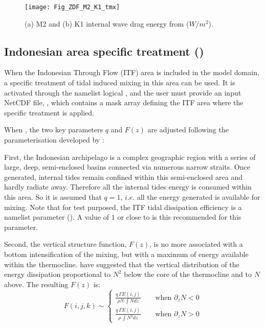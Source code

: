 \documentclass[../tex_main/NEMO_manual]{subfiles}
\begin{document}
\begin{figure}[!t] 	\begin{center}
\texttt{[image: Fig\_ZDF\_M2\_K1\_tmx]}
\caption{  \protect\label{fig:ZDF_M2_K1_tmx} 
(a) M2 and (b) K1 internal wave drag energy from \citet{Carrere_Lyard_GRL03} ($W/m^2$). }
\end{center}  	\end{figure}
 
\subsection{Indonesian area specific treatment (\protect{})}
\label{subsec:ZDF_tmx_itf}

When the Indonesian Through Flow (ITF) area is included in the model domain,
a specific treatment of tidal induced mixing in this area can be used. 
It is activated through the namelist logical , and the user must provide
an input NetCDF file, , which contains a mask array defining the ITF area
where the specific treatment is applied.

When , the two key parameters $q$ and $F(z)$ are adjusted following 
the parameterisation developed by \citet{Koch-Larrouy_al_GRL07}:

First, the Indonesian archipelago is a complex geographic region 
with a series of large, deep, semi-enclosed basins connected via 
numerous narrow straits. Once generated, internal tides remain 
confined within this semi-enclosed area and hardly radiate away. 
Therefore all the internal tides energy is consumed within this area. 
So it is assumed that $q = 1$, $i.e.$ all the energy generated is available for mixing.
Note that for test purposed, the ITF tidal dissipation efficiency is a 
namelist parameter (). A value of $1$ or close to is
this recommended for this parameter.

Second, the vertical structure function, $F(z)$, is no more associated
with a bottom intensification of the mixing, but with a maximum of 
energy available within the thermocline. \citet{Koch-Larrouy_al_GRL07} 
have suggested that the vertical distribution of the energy dissipation 
proportional to $N^2$ below the core of the thermocline and to $N$ above. 
The resulting $F(z)$ is:
\begin{equation} \label{eq:Fz_itf}
F(i,j,k) \sim     \left\{ \begin{aligned}
\frac{q\,\Gamma E(i,j) } {\rho N \, \int N     dz}    \qquad \text{when $\partial_z N < 0$} \\
\frac{q\,\Gamma E(i,j) } {\rho     \, \int N^2 dz}    \qquad \text{when $\partial_z N > 0$}
                      \end{aligned} \right.
\end{equation}
\end{document}
